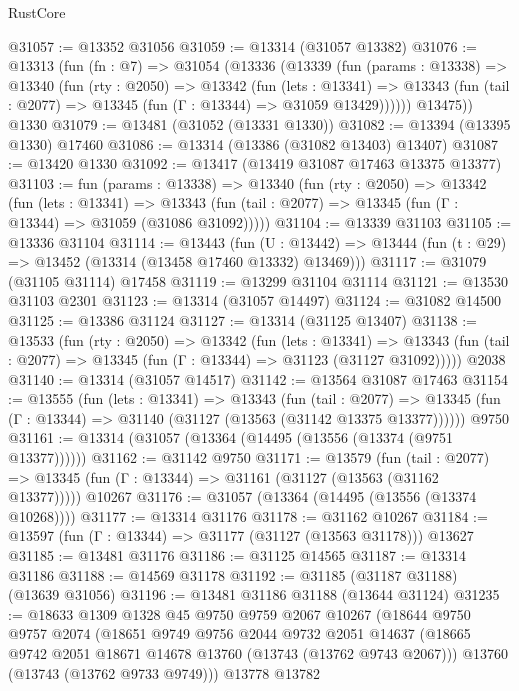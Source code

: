 \begin{lexlean}{RustCore}
\begin{coremodule}
@31057 := @13352 @31056
@31059 := @13314 (@31057 @13382)
@31076 := @13313
    (fun (fn : @7) =>
    @31054
      (@13336
        (@13339
          (fun (params : @13338) =>
          @13340
            (fun (rty : @2050) =>
            @13342
              (fun (lets : @13341) =>
              @13343 (fun (tail : @2077) => @13345 (fun (Γ : @13344) => @31059 @13429))))))
        @13475))
    @1330
@31079 := @13481 (@31052 (@13331 @1330))
@31082 := @13394 (@13395 @1330) @17460
@31086 := @13314 (@13386 (@31082 @13403) @13407)
@31087 := @13420 @1330
@31092 := @13417 (@13419 @31087 @17463 @13375 @13377)
@31103 := fun (params : @13338) =>
  @13340
    (fun (rty : @2050) =>
    @13342
      (fun (lets : @13341) =>
      @13343 (fun (tail : @2077) => @13345 (fun (Γ : @13344) => @31059 (@31086 @31092)))))
@31104 := @13339 @31103
@31105 := @13336 @31104
@31114 := @13443
    (fun (U : @13442) => @13444 (fun (t : @29) => @13452 (@13314 (@13458 @17460 @13332) @13469)))
@31117 := @31079 (@31105 @31114) @17458
@31119 := @13299 @31104 @31114
@31121 := @13530 @31103 @2301
@31123 := @13314 (@31057 @14497)
@31124 := @31082 @14500
@31125 := @13386 @31124
@31127 := @13314 (@31125 @13407)
@31138 := @13533
    (fun (rty : @2050) =>
    @13342
      (fun (lets : @13341) =>
      @13343 (fun (tail : @2077) => @13345 (fun (Γ : @13344) => @31123 (@31127 @31092)))))
    @2038
@31140 := @13314 (@31057 @14517)
@31142 := @13564 @31087 @17463
@31154 := @13555
    (fun (lets : @13341) =>
    @13343
      (fun (tail : @2077) =>
      @13345 (fun (Γ : @13344) => @31140 (@31127 (@13563 (@31142 @13375 @13377))))))
    @9750
@31161 := @13314 (@31057 (@13364 (@14495 (@13556 (@13374 (@9751 @13377))))))
@31162 := @31142 @9750
@31171 := @13579
    (fun (tail : @2077) => @13345 (fun (Γ : @13344) => @31161 (@31127 (@13563 (@31162 @13377)))))
    @10267
@31176 := @31057 (@13364 (@14495 (@13556 (@13374 @10268))))
@31177 := @13314 @31176
@31178 := @31162 @10267
@31184 := @13597 (fun (Γ : @13344) => @31177 (@31127 (@13563 @31178))) @13627
@31185 := @13481 @31176
@31186 := @31125 @14565
@31187 := @13314 @31186
@31188 := @14569 @31178
@31192 := @31185 (@31187 @31188) (@13639 @31056)
@31196 := @13481 @31186 @31188 (@13644 @31124)
@31235 := @18633
    @1309
    @1328
    @45
    @9750
    @9759
    @2067
    @10267
    (@18644
      @9750
      @9757
      @2074
      (@18651
        @9749
        @9756
        @2044
        @9732
        @2051
        @14637
        (@18665 @9742 @2051 @18671 @14678 @13760 (@13743 (@13762 @9743 @2067)))
        @13760
        (@13743 (@13762 @9733 @9749)))
      @13778
      @13782

\end{coremodule}
\end{lexlean}
